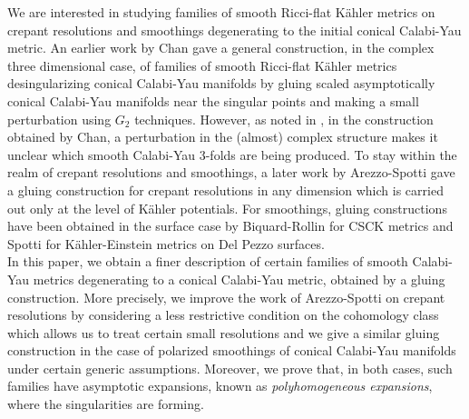 \documentclass[a4paper,11pt]{article}
\begin{document}
We are interested in studying families of smooth Ricci-flat Kähler metrics on crepant resolutions and smoothings degenerating to the initial conical Calabi-Yau metric. An earlier work by Chan \cite{chan_desingularizations_2006, chan_desingularizations_2009} gave a general construction, in the complex three dimensional case, of families of smooth Ricci-flat Kähler metrics desingularizing conical Calabi-Yau manifolds by gluing scaled asymptotically conical Calabi-Yau manifolds near the singular points and making a small perturbation using $G_2$ techniques. However, as noted in \cite[Appendix A]{hein_calabi-yau_2017}, in the construction obtained by Chan, a perturbation in the (almost) complex structure makes it unclear which smooth Calabi-Yau 3-folds are being produced. To stay within the realm of crepant resolutions and smoothings, a later work by Arezzo-Spotti \cite{arezzo2016csck} gave a gluing construction for crepant resolutions in any dimension which is carried out only at the level of Kähler potentials. For smoothings, gluing constructions have been obtained in the surface case by Biquard-Rollin \cite{Biquard} for CSCK metrics and Spotti \cite{Spotti} for Kähler-Einstein metrics on Del Pezzo surfaces.    \\ 

In this paper, we obtain a finer description of certain families of smooth Calabi-Yau metrics degenerating to a conical Calabi-Yau metric, obtained by a gluing construction. More precisely, we improve the work of Arezzo-Spotti \cite{arezzo2016csck} on crepant resolutions by considering a less restrictive condition on the cohomology class which allows us to treat certain small resolutions and we give a similar gluing construction in the case of polarized smoothings of conical Calabi-Yau manifolds under certain generic assumptions. Moreover, we prove that, in both cases, such families have asymptotic expansions, known as \emph{polyhomogeneous expansions}, where the singularities are forming.\\
\end{document}
